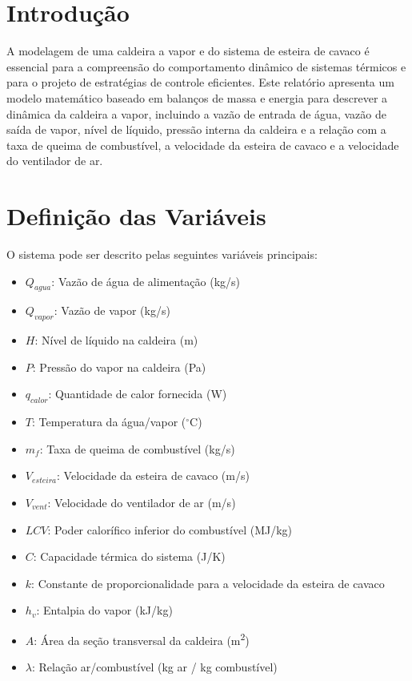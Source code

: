 \documentclass{article}
\begin{document}
\section{Introdu\c{c}\~ao}
A modelagem de uma caldeira a vapor e do sistema de esteira de cavaco \'e essencial para a compreens\~ao do comportamento din\^amico de sistemas t\'ermicos e para o projeto de estrat\'egias de controle eficientes. Este relat\'orio apresenta um modelo matem\'atico baseado em balan\c{c}os de massa e energia para descrever a din\^amica da caldeira a vapor, incluindo a vaz\~ao de entrada de \'agua, vaz\~ao de sa\'ida de vapor, n\'ivel de l\'iquido, press\~ao interna da caldeira e a rela\c{c}\~ao com a taxa de queima de combust\'ivel, a velocidade da esteira de cavaco e a velocidade do ventilador de ar.

\section{Defini\c{c}\~ao das Vari\'aveis}
O sistema pode ser descrito pelas seguintes vari\'aveis principais:
\begin{itemize}
    \item $Q_{agua}$: Vaz\~ao de \'agua de alimenta\c{c}\~ao (kg/s)
    \item $Q_{vapor}$: Vaz\~ao de vapor (kg/s)
    \item $H$: N\'ivel de l\'iquido na caldeira (m)
    \item $P$: Press\~ao do vapor na caldeira (Pa)
    \item $q_{calor}$: Quantidade de calor fornecida (W)
    \item $T$: Temperatura da \'agua/vapor ($^{\circ}$C)
    \item $m_f$: Taxa de queima de combust\'ivel (kg/s)
    \item $V_{esteira}$: Velocidade da esteira de cavaco (m/s)
    \item $V_{vent}$: Velocidade do ventilador de ar (m/s)
    \item $LCV$: Poder calor\'ifico inferior do combust\'ivel (MJ/kg)
    \item $C$: Capacidade t\'ermica do sistema (J/K)
    \item $k$: Constante de proporcionalidade para a velocidade da esteira de cavaco
    \item $h_v$: Entalpia do vapor (kJ/kg)
    \item $A$: \'Area da se\c{c}\~ao transversal da caldeira (m\textsuperscript{2})
    \item $\lambda$: Rela\c{c}\~ao ar/combust\'ivel (kg ar / kg combust\'ivel)
\end{itemize}
\end{document}
